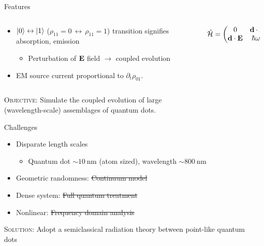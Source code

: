 \documentclass[aspectratio=169, usenames, dvipsnames]{beamer}
\begin{document}
\begin{frame}{Features}
  \begin{columns}[t]
    \begin{column}{0.75\textwidth}
      \begin{itemize}
        \item $\ket{0} \leftrightarrow \ket{1}$ ($\rho_{11} = 0 \, \leftrightarrow \, \rho_{11} = 1$) transition signifies absorption, \alert{emission}
          \begin{itemize}
            \item Perturbation of $\vb{E}$ field $\to$ coupled evolution
          \end{itemize}
        \item EM source current proportional to $\partial_t \rho_{01}$.
      \end{itemize}
    \end{column}
    \begin{column}{0.25\textwidth}
      \begin{gather*}
        \hat{\mathcal{H}} = \mqty( 0 & \vb{d} \cdot \vb{E} \\ \vb{d} \cdot \vb{E} & \hbar \omega_0)
      \end{gather*}
    \end{column}
  \end{columns}

  \vfill

  \begin{block}{\textsc{Objective}:}
    \centering
    Simulate the coupled evolution of large \\ (wavelength-scale) assemblages of quantum dots.
  \end{block}
\end{frame}

\begin{frame}{Challenges}
  \begin{itemize}
    \item Disparate length scales
      \begin{itemize}
        \item Quantum dot $\sim \SI{10}{\nano\meter}$ (atom sized), wavelength $\sim \SI{800}{\nano\meter}$
      \end{itemize}
    \item Geometric randomness: \sout{Continuum model}
    \item Dense system: \sout{Full quantum treatment}
    \item Nonlinear: \sout{Frequency domain analysis}
  \end{itemize}

  \vfill

  \begin{block}{\textsc{Solution}:}
    \centering
    Adopt a semiclassical radiation theory between point-like quantum dots
  \end{block}
\end{frame}
\end{document}
